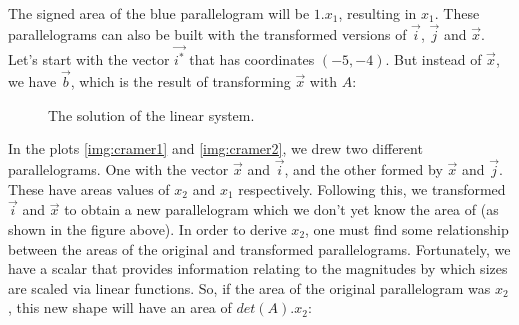 \documentclass[a4,12pt,twosided,openany]{memoir}
\begin{document}
The signed area of the blue parallelogram will be $1.x_1$, resulting in $x_1$. These parallelograms can also be built with the transformed versions of $\overrightarrow{i}$, $\overrightarrow{j}$ and $\overrightarrow{x}$. Let’s start with the vector $\overrightarrow{i^*}$ that has coordinates $(−5,−4)$. But instead of $\overrightarrow{x}$, we have $\overrightarrow{b}$, which is the result of transforming $\overrightarrow{x}$ with $A$:
\newpage
\begin{figure}[h!]
\begin{center}
\end{center}
\caption{The solution of the linear system.}
\end{figure}
\par 
\indent
In the plots \ref{img:cramer1} and \ref{img:cramer2}, we drew two different parallelograms. One with the vector $\overrightarrow{x}$ and $\overrightarrow{i}$, and the other formed by $\overrightarrow{x}$ and $\overrightarrow{j}$. These have areas values of $x_2$ and $x_1$ respectively. Following this, we transformed $\overrightarrow{i}$ and $\overrightarrow{x}$ to obtain a new parallelogram which we don’t yet know the area of (as shown in the figure above). In order to derive $x_2$, one must find some relationship between the areas of the original and transformed parallelograms. Fortunately, we have a scalar that provides information relating to the magnitudes by which sizes are scaled via linear functions. So, if the area of the original parallelogram was $x_2$, this new shape will have an area of $det(A).x_2$:
\end{document}
